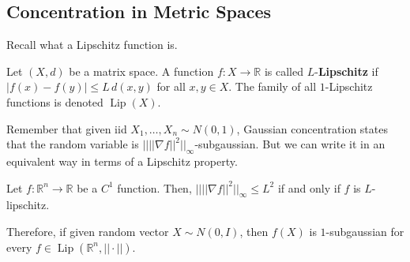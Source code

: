 \documentclass{article}
\DeclareMathOperator{\Lip}{Lip}
\begin{document}
\subsection{Concentration in Metric Spaces}

Recall what a Lipschitz function is. 

\begin{definition}
Let $(X, d)$ be a matrix space. A function $f: X \rightarrow \mathbb{R}$ is called $L$-\textbf{Lipschitz} if $|f(x) - f(y)| \leq L \, d(x, y)$ for all $x, y \in X$. The family of all $1$-Lipschitz functions is denoted $\Lip(X)$. 
\end{definition}

Remember that given iid $X_1, \ldots, X_n \sim N(0, 1)$, Gaussian concentration states that the random variable is $|| ||\nabla f||^2 ||_\infty$-subgaussian. But we can write it in an equivalent way in terms of a Lipschitz property. 

\begin{lemma}
Let $f: \mathbb{R}^n \rightarrow \mathbb{R}$ be a $C^1$ function. Then, $|| ||\nabla f||^2 ||_\infty \leq L^2$ if and only if $f$ is $L$-lipschitz. 
\end{lemma}

Therefore, if given random vector $X \sim N(0, I)$, then $f(X)$ is $1$-subgaussian for every $f \in \Lip(\mathbb{R}^n, ||\cdot||)$. 
\end{document}
